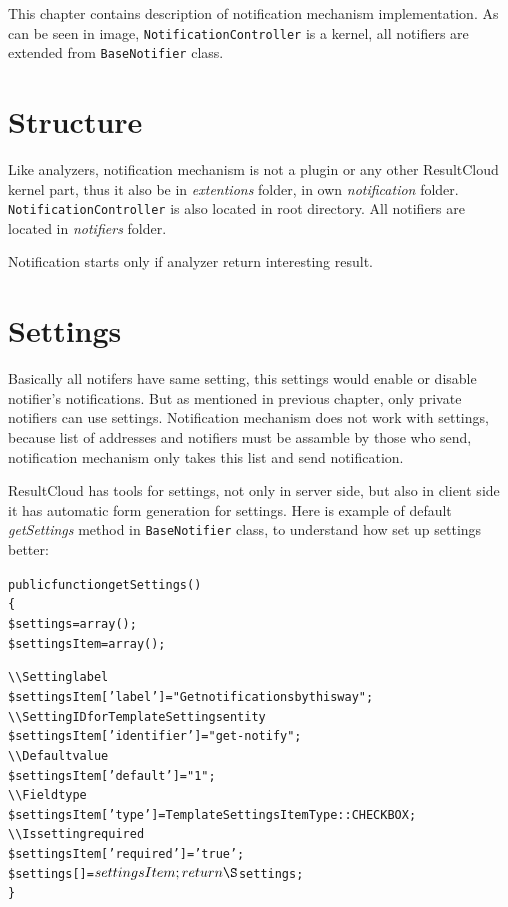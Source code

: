 This chapter contains description of notification mechanism implementation. As can be seen in image, \texttt{NotificationController} is a kernel, all notifiers are extended from \texttt{BaseNotifier} class.

\section{Structure}

Like analyzers, notification mechanism is not a plugin or any other ResultCloud kernel part, thus it also be in \emph{extentions} folder, in own \emph{notification} folder. \texttt{NotificationController} is also located in root directory. All notifiers are located in \emph{notifiers} folder.

Notification starts only if analyzer return interesting result.

\section{Settings}

Basically all notifers have same setting, this settings would enable or disable notifier's notifications. But as mentioned in previous chapter, only private notifiers can use settings. Notification mechanism does not work with settings, because list of addresses and notifiers must be assamble by those who send, notification mechanism only takes this list and send notification. 

ResultCloud has tools for settings, not only in server side, but also in client side it has automatic form generation for settings. Here is example of default \emph{getSettings} method in \texttt{BaseNotifier} class, to understand how set up settings better:

\begin{alltt}
public function getSettings()
\{
    \$settings = array();
    \$settingsItem = array();

    \textbackslash\textbackslash Setting label
    \$settingsItem['label'] = "Get notifications by this way";
    \textbackslash\textbackslash Setting ID for TemplateSettings entity
    \$settingsItem['identifier'] = "get-notify";
    \textbackslash\textbackslash Default value
    \$settingsItem['default'] = "1";
    \textbackslash\textbackslash Field type
    \$settingsItem['type'] = TemplateSettingsItemType::CHECKBOX;
    \textbackslash\textbackslash Is setting required
    \$settingsItem['required'] = 'true';
    \$settings[] = $settingsItem;

    return \S$settings; 
\}
\end{alltt}

